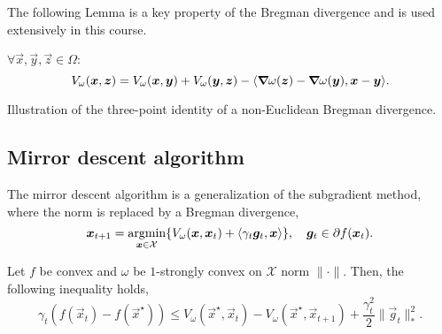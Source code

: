 The following Lemma is a key property of the Bregman divergence and is used extensively in this
course.

\begin{lemma}
    $\forall \vec{x}, \vec{y}, \vec{z} \in \Omega$: \[
        V_{\omega}(\bm{x}, \bm{z}) = V_{\omega}(\bm{x}, \bm{y}) + V_{\omega}(\bm{y}, \bm{z}) - \langle \bm{\nabla}_{\! } \omega(\bm{z}) - \bm{\nabla}_{\! } \omega(\bm{y}), \bm{x} - \bm{y} \rangle.
    \]
\end{lemma}

\begin{marginfigure}
    \centering
    \caption{Illustration of the three-point identity of a non-Euclidean Bregman divergence.}
    \label{fig:three-point-identity}
\end{marginfigure}

\subsection{Mirror descent algorithm}

The mirror descent algorithm is a generalization of the subgradient method, where the norm is
replaced by a Bregman divergence, \[
    \vec{x}_{t+1} = \argmin_{\vec{x} \in \mathcal{X}} \lft\{ V_{\omega}(\vec{x}, \vec{x}_t) + \langle \gamma_t \vec{g}_t, \vec{x} \rangle \rgt\}, \quad \vec{g}_t \in \partial f(\vec{x}_t).
\]

\begin{lemma}
    Let $f$ be convex and $\omega$ be $1$-strongly convex on $\mathcal{X}$ \wrt norm $\| \cdot \|$.
    Then, the following inequality holds, \[
        \gamma_t (f(\vec{x}_t) - f(\vec{x}^\star)) \leq V_{\omega}(\vec{x}^\star, \vec{x}_t) - V_{\omega}(\vec{x}^\star, \vec{x}_{t+1}) + \frac{\gamma_t^2}{2} \| \vec{g}_t \|_*^2.
    \]
\end{lemma}

